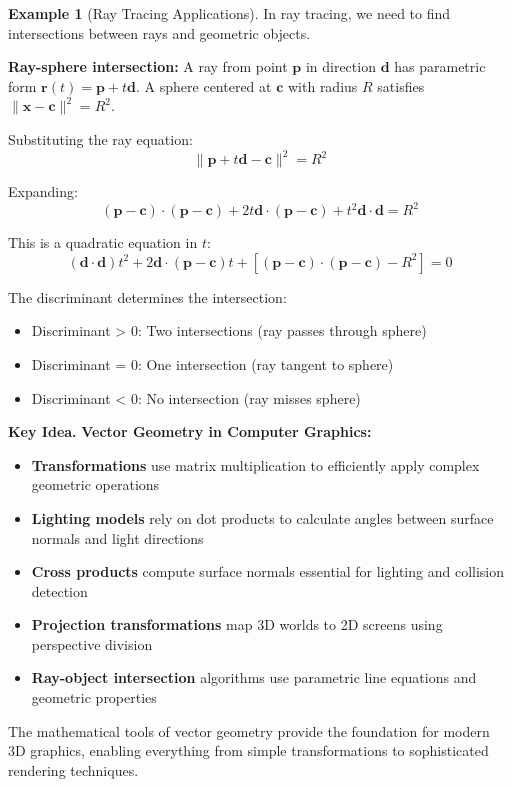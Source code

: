 \documentclass[12pt]{article}
\numberwithin{equation}{section}
\newcommand{\vect}[1]{\boldsymbol{#1}}   %
\theoremstyle{plain}
\theoremstyle{definition}
\newtheorem{example}[theorem]{Example}
\theoremstyle{remark}
\newenvironment{keyidea}{\begin{tcolorbox}\textbf{Key Idea.}}{\end{tcolorbox}}
\begin{document}
\begin{example}[Ray Tracing Applications]
In ray tracing, we need to find intersections between rays and geometric objects.

\textbf{Ray-sphere intersection:} A ray from point $\vect{p}$ in direction $\vect{d}$ has parametric form $\vect{r}(t) = \vect{p} + t\vect{d}$. A sphere centered at $\vect{c}$ with radius $R$ satisfies $\|\vect{x} - \vect{c}\|^2 = R^2$.

Substituting the ray equation:
$$\|\vect{p} + t\vect{d} - \vect{c}\|^2 = R^2$$

Expanding:
$$(\vect{p} - \vect{c}) \cdot (\vect{p} - \vect{c}) + 2t\vect{d} \cdot (\vect{p} - \vect{c}) + t^2\vect{d} \cdot \vect{d} = R^2$$

This is a quadratic equation in $t$:
$$(\vect{d} \cdot \vect{d})t^2 + 2\vect{d} \cdot (\vect{p} - \vect{c})t + [(\vect{p} - \vect{c}) \cdot (\vect{p} - \vect{c}) - R^2] = 0$$

The discriminant determines the intersection:
\begin{itemize}
\item Discriminant > 0: Two intersections (ray passes through sphere)
\item Discriminant = 0: One intersection (ray tangent to sphere)
\item Discriminant < 0: No intersection (ray misses sphere)
\end{itemize}
\end{example}

\begin{keyidea}
\textbf{Vector Geometry in Computer Graphics:}
\begin{itemize}
\item \textbf{Transformations} use matrix multiplication to efficiently apply complex geometric operations
\item \textbf{Lighting models} rely on dot products to calculate angles between surface normals and light directions
\item \textbf{Cross products} compute surface normals essential for lighting and collision detection
\item \textbf{Projection transformations} map 3D worlds to 2D screens using perspective division
\item \textbf{Ray-object intersection} algorithms use parametric line equations and geometric properties
\end{itemize}

The mathematical tools of vector geometry provide the foundation for modern 3D graphics, enabling everything from simple transformations to sophisticated rendering techniques.
\end{keyidea}
\end{document}
